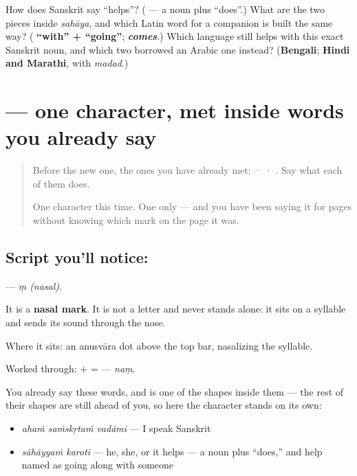 \begin{tcolorbox}[breakable,colback=teal!4,colframe=teal!35!black,title={Before you move on}]
How does Sanskrit say \textquotedblleft{}helps\textquotedblright{}? (\textbf{ } — a noun plus \textquotedblleft{}does\textquotedblright{}.) What are the two pieces inside \emph{sahāya}, and which Latin word for a companion is built the same way? (\textbf{ \textquotedblleft{}with\textquotedblright{} +  \textquotedblleft{}going\textquotedblright{}}; \emph{\textbf{comes}}.) Which language still helps with this exact Sanskrit noun, and which two borrowed an Arabic one instead? (\textbf{Bengali}; \textbf{Hindi and Marathi}, with \emph{madad}.)
\end{tcolorbox}
\section[\texorpdfstring{\sk{ं} (ṃ)}{ं (ṃ)}]{ — one character, met inside words you already say}

\label{lesson:SA-S209-sign-anusvara}



\begin{quote}
Before the new one, the ones you have already met:  ·  · . Say what each of them does.

One character this time. One only — and you have been saying it for pages without knowing which mark on the page it was.
\end{quote}

\subsection*{Script you'll notice: }
\textbf{} — \emph{ṃ (nasal)}.

It is a \textbf{nasal mark}. It is not a letter and never stands alone: it sits on a syllable and sends its sound through the nose.

Where it sits: an anusvāra dot above the top bar, nasalizing the syllable.

Worked through: \textbf{} + \textbf{} = \textbf{} — \emph{naṃ}.

You already say these words, and  is one of the shapes inside them — the rest of their shapes are still ahead of you, so here the character stands on its own:

\begin{itemize}
\raggedright
  \item \emph{ahaṁ saṁskṛtaṁ vadāmi} — I speak Sanskrit
  \item \emph{sāhāyyaṁ karoti} — he, she, or it helps — a noun plus \textquotedblleft{}does,\textquotedblright{} and help named as going along with someone
\end{itemize}

